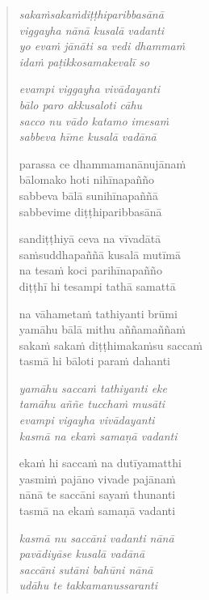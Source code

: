 

\cleartoverso

\vspace*{30mm}

\begin{verse}

\emph{sakaṁsakaṁdiṭṭhiparibbasānā\\
viggayha nānā kusalā vadanti}\\
\emph{yo evaṁ jānāti sa vedi dhammaṁ\\
idaṁ paṭikkosamakevalī so}

\emph{evampi viggayha vivādayanti\\
bālo paro akkusaloti cāhu}\\
\emph{sacco nu vādo katamo imesaṁ\\
sabbeva hīme kusalā vadānā}

parassa ce dhammamanānujānaṁ\\
bālomako hoti nihīnapañño\\
sabbeva bālā sunihīnapaññā\\
sabbevime diṭṭhiparibbasānā

sandiṭṭhiyā ceva na vīvadātā\\
saṁsuddhapaññā kusalā mutīmā\\
na tesaṁ koci parihīnapañño\\
diṭṭhī hi tesampi tathā samattā

na vāhametaṁ tathiyanti brūmi\\
yamāhu bālā mithu aññamaññaṁ\\
sakaṁ sakaṁ diṭṭhimakaṁsu saccaṁ\\
tasmā hi bāloti paraṁ dahanti

\emph{yamāhu saccaṁ tathiyanti eke\\
tamāhu aññe tucchaṁ musāti}\\
\emph{evampi vigayha vivādayanti\\
kasmā na ekaṁ samaṇā vadanti}

ekaṁ hi saccaṁ na dutīyamatthi\\
yasmiṁ pajāno vivade pajānaṁ\\
nānā te saccāni sayaṁ thunanti\\
tasmā na ekaṁ samaṇā vadanti

\emph{kasmā nu saccāni vadanti nānā\\
pavādiyāse kusalā vadānā}\\
\emph{saccāni sutāni bahūni nānā\\
udāhu te takkamanussaranti}


\end{verse}
